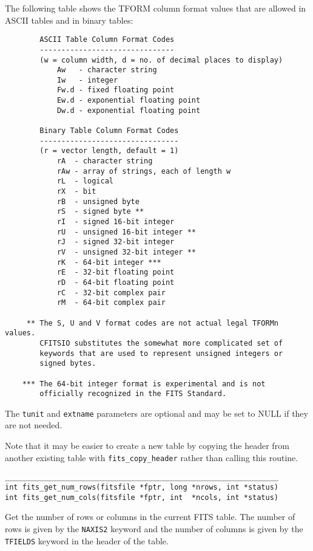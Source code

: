 \documentclass[11pt]{article}
\begin{document}
The following table
shows the TFORM column format values that are allowed in ASCII tables
and in binary tables:
\begin{verbatim}
        ASCII Table Column Format Codes
        -------------------------------
        (w = column width, d = no. of decimal places to display)
            Aw   - character string
            Iw   - integer
            Fw.d - fixed floating point
            Ew.d - exponential floating point
            Dw.d - exponential floating point

        Binary Table Column Format Codes
        --------------------------------
        (r = vector length, default = 1)
            rA  - character string
            rAw - array of strings, each of length w
            rL  - logical
            rX  - bit
            rB  - unsigned byte
            rS  - signed byte **
            rI  - signed 16-bit integer
            rU  - unsigned 16-bit integer **
            rJ  - signed 32-bit integer
            rV  - unsigned 32-bit integer **
            rK  - 64-bit integer ***
            rE  - 32-bit floating point
            rD  - 64-bit floating point
            rC  - 32-bit complex pair
            rM  - 64-bit complex pair

     ** The S, U and V format codes are not actual legal TFORMn values.
        CFITSIO substitutes the somewhat more complicated set of
        keywords that are used to represent unsigned integers or
        signed bytes.

    *** The 64-bit integer format is experimental and is not 
        officially recognized in the FITS Standard.
\end{verbatim}
  
The {\tt tunit} and {\tt extname} parameters are optional and
may be set to NULL
if they are not needed.  

Note that it may be easier to create a new table by copying the
header from another existing table with {\tt fits\_copy\_header} rather
than calling this routine.

\begin{verbatim}
_______________________________________________________________
int fits_get_num_rows(fitsfile *fptr, long *nrows, int *status)
int fits_get_num_cols(fitsfile *fptr, int  *ncols, int *status)
\end{verbatim}

Get the number of rows or columns in the current FITS table.  The
number of rows is given by the {\tt NAXIS2} keyword and the number of columns
is given by the {\tt TFIELDS} keyword in the header of the table.
\end{document}
